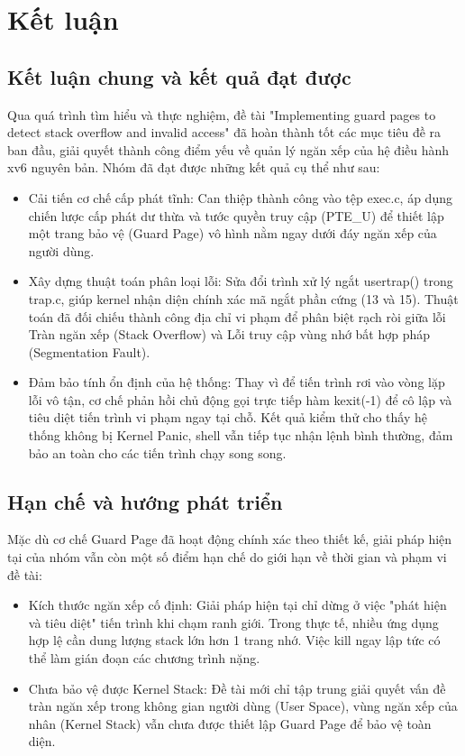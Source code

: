 \chapter{Kết luận}

\section{Kết luận chung và kết quả đạt được}
Qua quá trình tìm hiểu và thực nghiệm, đề tài "Implementing guard pages to detect stack overflow and invalid access" đã hoàn thành tốt các mục tiêu đề ra ban đầu, giải quyết thành công điểm yếu về quản lý ngăn xếp của hệ điều hành xv6 nguyên bản. Nhóm đã đạt được những kết quả cụ thể như sau:
\begin{itemize}
    \item Cải tiến cơ chế cấp phát tĩnh: Can thiệp thành công vào tệp exec.c, áp dụng chiến lược cấp phát dư thừa và tước quyền truy cập (PTE\_U) để thiết lập một trang bảo vệ (Guard Page) vô hình nằm ngay dưới đáy ngăn xếp của người dùng.
    \item Xây dựng thuật toán phân loại lỗi: Sửa đổi trình xử lý ngắt usertrap() trong trap.c, giúp kernel nhận diện chính xác mã ngắt phần cứng (13 và 15). Thuật toán đã đối chiếu thành công địa chỉ vi phạm để phân biệt rạch ròi giữa lỗi Tràn ngăn xếp (Stack Overflow) và Lỗi truy cập vùng nhớ bất hợp pháp (Segmentation Fault).
    \item Đảm bảo tính ổn định của hệ thống: Thay vì để tiến trình rơi vào vòng lặp lỗi vô tận, cơ chế phản hồi chủ động gọi trực tiếp hàm kexit(-1) để cô lập và tiêu diệt tiến trình vi phạm ngay tại chỗ. Kết quả kiểm thử cho thấy hệ thống không bị Kernel Panic, shell vẫn tiếp tục nhận lệnh bình thường, đảm bảo an toàn cho các tiến trình chạy song song.
\end{itemize}

\section{Hạn chế và hướng phát triển}
Mặc dù cơ chế Guard Page đã hoạt động chính xác theo thiết kế, giải pháp hiện tại của nhóm vẫn còn một số điểm hạn chế do giới hạn về thời gian và phạm vi đề tài:
\begin{itemize}
    \item Kích thước ngăn xếp cố định: Giải pháp hiện tại chỉ dừng ở việc "phát hiện và tiêu diệt" tiến trình khi chạm ranh giới. Trong thực tế, nhiều ứng dụng hợp lệ cần dung lượng stack lớn hơn 1 trang nhớ. Việc kill ngay lập tức có thể làm gián đoạn các chương trình nặng.
    \item Chưa bảo vệ được Kernel Stack: Đề tài mới chỉ tập trung giải quyết vấn đề tràn ngăn xếp trong không gian người dùng (User Space), vùng ngăn xếp của nhân (Kernel Stack) vẫn chưa được thiết lập Guard Page để bảo vệ toàn diện.
\end{itemize}


